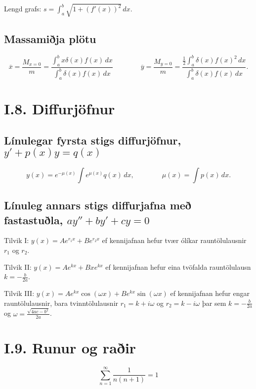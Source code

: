 Lengd grafs: $s=\int_a^b \sqrt{1+(f'(x))^2}\, dx$.


\subsection*{Massamiðja plötu}
\[
  \overline{x}=\frac{M_{x=0}}{m}=
  \frac{\int_a^b x\delta(x)f(x)\,dx}{\int_a^b \delta(x)f(x)\,dx}\qquad \qquad
  \overline{y}=\frac{M_{y=0}}{m}=
  \frac{\frac{1}{2}\int_a^b \delta(x)f(x)^2\,dx}{\int_a^b
  \delta(x)f(x)\,dx}.
\]

\section*{I.8. Diffurjöfnur}
\subsection*{Línulegar fyrsta stigs diffurjöfnur, $y'+p(x)y=q(x)$}
\[
  y(x)=e^{-\mu(x)}\int e^{\mu(x)}q(x)\,dx, \qquad \qquad \mu(x) = \int p(x)\, dx.
\]

\subsection*{Línuleg annars stigs diffurjafna með fastastuðla, $a y''+by'+cy=0$}

Tilvik I:
$y(x)=Ae^{r_1x}+Be^{r_2x}$
ef kennijafnan hefur tvær ólíkar rauntölulausnir $r_1$ og $r_2$.

Tilvik II:
$y(x)=Ae^{kx}+Bxe^{kx}$ ef kennijafnan 
hefur eina tvöfalda rauntölulausn $k=-\frac{b}{2a}$.

Tilvik III:
$y(x)=Ae^{kx}\cos(\omega x)+Be^{kx}\sin(\omega x)$
ef kennijafnan hefur engar rauntölulausnir,
bara tvinntölulausnir $r_1=k+i\omega$ og $r_2=k-i\omega$ þar sem 
$k=-\frac{b}{2a}$ og $\omega=\frac{\sqrt{4ac-b^2}}{2a}$.



\section*{I.9. Runur og raðir}
\[
  \sum_{n=1}^\infty \frac{1}{n(n+1)} =1
\]

